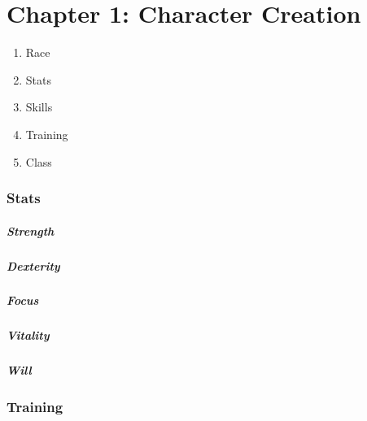 \chapter[Chapter 1: Character Creation]{Chapter 1: Character Creation}

\begin{enumerate}
	\item Race
	\item Stats
	\item Skills
	\item Training
	\item Class
\end{enumerate}

\vspace{.1in}

\subsection*{Stats}

\vspace{.1in}

\paragraph{Strength}
\indent

\paragraph{Dexterity}
\indent

\paragraph{Focus}
\indent

\paragraph{Vitality}
\indent

\paragraph{Will}
\indent

\vspace{.1in}

\subsection*{Training}

\vspace{.1in}

